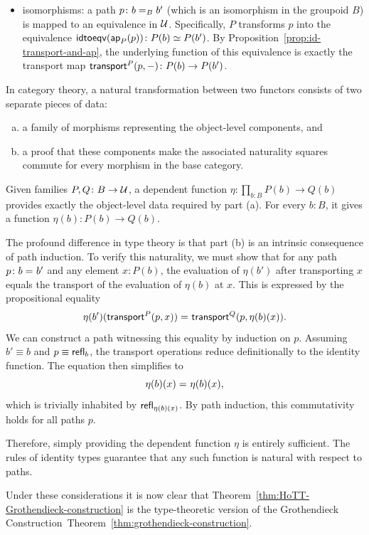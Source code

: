 \begin{rem}
\begin{itemize}
        \item isomorphisms: a path $p\colon b\eq{B}b'$ (which is an isomorphism in the groupoid $B$) is mapped to an equivalence in $\mathcal U$. Specifically, $P$ transforms $p$ into the equivalence $\fun{idtoeqv}(\fun{ap}_P(p))\colon P(b)\simeq P(b')$. By Proposition~\ref{prop:id-transport-and-ap}, the underlying function of this equivalence is exactly the transport map $\fun{transport}^P(p,\dummy)\colon P(b)\to P(b')$.
    \end{itemize}

    In category theory, a natural transformation between two functors consists of two separate pieces of data:
    \begin{enumerate}[a)]
        \item a family of morphisms representing the object-level components, and
        
        \item a proof that these components make the associated naturality squares commute for every morphism in the base category.
    \end{enumerate}
    Given families $P, Q\colon B\to\univ$, a dependent function $\eta\colon\prod_{b\colon B}P(b)\to Q(b)$ provides exactly the object-level data required by part (a). For every $b\colon B$, it gives a function $\eta(b)\colon P(b)\to Q(b)$.
    
    The profound difference in type theory is that part (b) is an intrinsic consequence of path induction. To verify this naturality, we must show that for any path $p\colon b\eq{}b'$ and any element $x\colon P(b)$, the evaluation of $\eta(b')$ after transporting $x$ equals the transport of the evaluation of $\eta(b)$ at $x$. This is expressed by the propositional equality
    \[
        \eta(b')(\mathsf{transport}^P(p,x)) \mathrel{=_{}} \mathsf{transport}^Q(p,\eta(b)(x)).
    \]
    We can construct a path witnessing this equality by induction on $p$. Assuming $b'\equiv b$ and $p\equiv\mathsf{refl}_b$, the transport operations reduce definitionally to the identity function. The equation then simplifies to
    \[
        \eta(b)(x) \mathrel{=_{}} \eta(b)(x),
    \]
    which is trivially inhabited by $\mathsf{refl}_{\eta(b)(x)}$. By path induction, this commutativity holds for all paths $p$. 
    
    Therefore, simply providing the dependent function $\eta$ is entirely sufficient. The rules of identity types guarantee that any such function is natural with respect to paths.

    Under these considerations it is now clear that Theorem~\ref{thm:HoTT-Grothendieck-construction} is the type-theoretic version of the Grothendieck Construction~Theorem~\ref{thm:grothendieck-construction}.
\end{rem}

